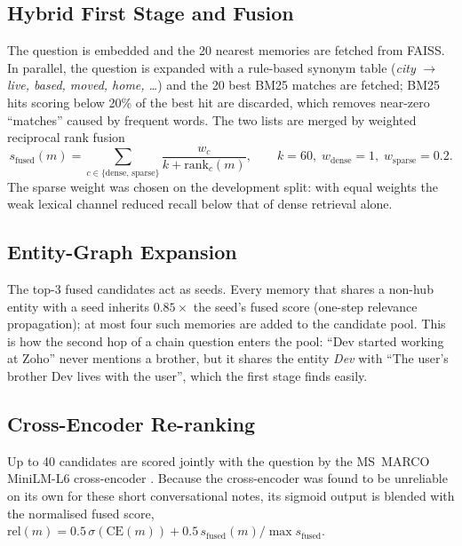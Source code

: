 \subsection{Hybrid First Stage and Fusion}
\label{sec:fusion}
The question is embedded and the 20 nearest memories are fetched from FAISS. In parallel, the question is
expanded with a rule-based synonym table (\emph{city} $\rightarrow$ \emph{live, based, moved, home, \dots})
and the 20 best BM25 matches are fetched; BM25 hits scoring below 20\% of the best hit are discarded, which
removes near-zero ``matches'' caused by frequent words. The two lists are merged by weighted reciprocal
rank fusion \cite{rrf}
\[
  s_{\text{fused}}(m) = \sum_{c \in \{\text{dense},\,\text{sparse}\}} \frac{w_c}{k + \text{rank}_c(m)},
  \qquad k = 60,\; w_{\text{dense}} = 1,\; w_{\text{sparse}} = 0.2 .
\]
The sparse weight was chosen on the development split: with equal weights the weak lexical channel reduced
recall below that of dense retrieval alone.

\subsection{Entity-Graph Expansion}
The top-3 fused candidates act as seeds. Every memory that shares a non-hub entity with a seed inherits
$0.85\times$ the seed's fused score (one-step relevance propagation); at most four such memories are added
to the candidate pool. This is how the second hop of a chain question enters the pool: ``Dev started working
at Zoho'' never mentions a brother, but it shares the entity \emph{Dev} with ``The user's brother Dev lives
with the user'', which the first stage finds easily.

\subsection{Cross-Encoder Re-ranking}
Up to 40 candidates are scored jointly with the question by the MS~MARCO MiniLM-L6 cross-encoder
\cite{nogueira2019}. Because the cross-encoder was found to be unreliable on its own for these short
conversational notes, its sigmoid output is blended with the normalised fused score,
$\text{rel}(m) = 0.5\,\sigma(\text{CE}(m)) + 0.5\, s_{\text{fused}}(m)/\max s_{\text{fused}}$.

